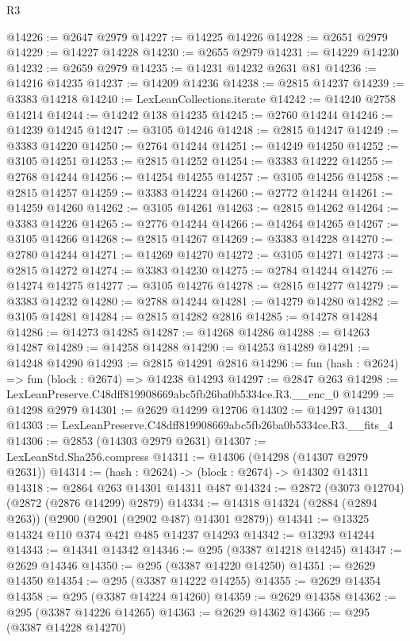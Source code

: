 \begin{lexlean}{R3}
\begin{coremodule}
@14226 := @2647 @2979
@14227 := @14225 @14226
@14228 := @2651 @2979
@14229 := @14227 @14228
@14230 := @2655 @2979
@14231 := @14229 @14230
@14232 := @2659 @2979
@14235 := @14231 @14232 @2631 @81
@14236 := @14216 @14235
@14237 := @14209 @14236
@14238 := @2815 @14237
@14239 := @3383 @14218
@14240 := LexLeanCollections.iterate
@14242 := @14240 @2758 @14214
@14244 := @14242 @138 @14235
@14245 := @2760 @14244
@14246 := @14239 @14245
@14247 := @3105 @14246
@14248 := @2815 @14247
@14249 := @3383 @14220
@14250 := @2764 @14244
@14251 := @14249 @14250
@14252 := @3105 @14251
@14253 := @2815 @14252
@14254 := @3383 @14222
@14255 := @2768 @14244
@14256 := @14254 @14255
@14257 := @3105 @14256
@14258 := @2815 @14257
@14259 := @3383 @14224
@14260 := @2772 @14244
@14261 := @14259 @14260
@14262 := @3105 @14261
@14263 := @2815 @14262
@14264 := @3383 @14226
@14265 := @2776 @14244
@14266 := @14264 @14265
@14267 := @3105 @14266
@14268 := @2815 @14267
@14269 := @3383 @14228
@14270 := @2780 @14244
@14271 := @14269 @14270
@14272 := @3105 @14271
@14273 := @2815 @14272
@14274 := @3383 @14230
@14275 := @2784 @14244
@14276 := @14274 @14275
@14277 := @3105 @14276
@14278 := @2815 @14277
@14279 := @3383 @14232
@14280 := @2788 @14244
@14281 := @14279 @14280
@14282 := @3105 @14281
@14284 := @2815 @14282 @2816
@14285 := @14278 @14284
@14286 := @14273 @14285
@14287 := @14268 @14286
@14288 := @14263 @14287
@14289 := @14258 @14288
@14290 := @14253 @14289
@14291 := @14248 @14290
@14293 := @2815 @14291 @2816
@14296 := fun (hash : @2624) => fun (block : @2674) => @14238 @14293
@14297 := @2847 @263
@14298 := LexLeanPreserve.C48dff819908669abc5fb26ba0b5334ce.R3.__enc_0
@14299 := @14298 @2979
@14301 := @2629 @14299 @12706
@14302 := @14297 @14301
@14303 := LexLeanPreserve.C48dff819908669abc5fb26ba0b5334ce.R3.__fits_4
@14306 := @2853 (@14303 @2979 @2631)
@14307 := LexLeanStd.Sha256.compress
@14311 := @14306 (@14298 (@14307 @2979 @2631))
@14314 := (hash : @2624) -> (block : @2674) -> @14302 @14311
@14318 := @2864 @263 @14301 @14311 @487
@14324 := @2872 (@3073 @12704) (@2872 (@2876 @14299) @2879)
@14334 := @14318 @14324 (@2884 (@2894 @263)) (@2900 (@2901 (@2902 @487) @14301 @2879))
@14341 := @13325 @14324 @110 @374 @421 @485 @14237 @14293
@14342 := @13293 @14244
@14343 := @14341 @14342
@14346 := @295 (@3387 @14218 @14245)
@14347 := @2629 @14346
@14350 := @295 (@3387 @14220 @14250)
@14351 := @2629 @14350
@14354 := @295 (@3387 @14222 @14255)
@14355 := @2629 @14354
@14358 := @295 (@3387 @14224 @14260)
@14359 := @2629 @14358
@14362 := @295 (@3387 @14226 @14265)
@14363 := @2629 @14362
@14366 := @295 (@3387 @14228 @14270)

\end{coremodule}
\end{lexlean}
